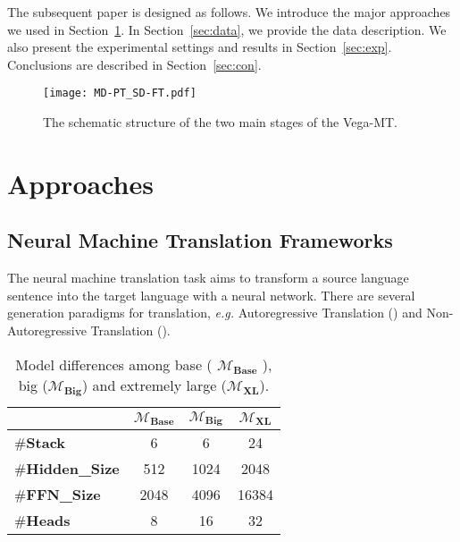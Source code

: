 \documentclass[11pt,a4paper]{article}
\begin{document}
The subsequent paper is designed as follows. We introduce the major approaches we used in Section~\ref{sec:app}. In Section~\ref{sec:data}, we provide the data description. We also present the  experimental settings and results in Section~\ref{sec:exp}. Conclusions are described in Section~\ref{sec:con}.


\begin{figure*}[htb]
    \centering
    \texttt{[image: MD-PT\_SD-FT.pdf]}
    \caption{The schematic structure of the two main stages of the Vega-MT. }
    \label{fig:system}
\end{figure*}

\section{Approaches}
\label{sec:app}

\subsection{Neural Machine Translation Frameworks}
\label{ssec:nmt}
The neural machine translation task aims to transform a source language sentence into the target language with a neural network. There are several generation paradigms for translation, \textit{e.g.} Autoregressive Translation (\citealp[AT,][]{rnnsearch,transformer}) and Non-Autoregressive Translation (\citealp[NAT,][]{gu2018non}).

\begin{table}[]
    \centering
    \begin{tabular}{lccc}
    \toprule
    \textbf{} & \bf $\mathcal{M}_{\textbf{Base}}$ & \bf $\mathcal{M}_{\textbf{Big}}$ & \bf $\mathcal{M}_{\textbf{XL}}$  \\ \hline
    {\bf $\#$Stack}  &     6    & 6     & 24    \\
    {\bf $\#$Hidden\_Size}  &    512       & 1024  & 2048  \\
    {\bf $\#$FFN\_Size}  &     2048        & 4096  & 16384 \\
    {\bf $\#$Heads}  &    8    & 16    & 32    \\
    \bottomrule
    \end{tabular}
    \caption{\label{tab:models} Model differences among base ( $\mathcal{M}_{\textbf{Base}}$ ), big ($\mathcal{M}_{\textbf{Big}}$) and extremely large ($\mathcal{M}_{\textbf{XL}}$).}
\end{table}
\end{document}

